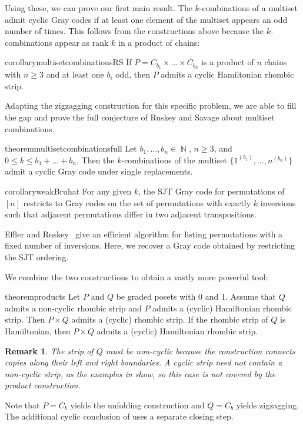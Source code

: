 \documentclass[fontsize=11pt,a4paper,DIV=12]{scrartcl}
\newtheorem{remark}[theorem]{Remark}
\DeclareMathOperator{\N}{\mathbb{N}}
\begin{document}
Using these, we can prove our first main result. The $k$-combinations of a multiset admit cyclic Gray codes if at least one element of the multiset appears an odd number of times. This follows from the constructions above because the $k$-combinations appear as rank $k$ in a product of chains:

\begin{restatable}{corollary}{multisetcombinationsRS}\label{thm:multiset combinations}
	If $P=C_{b_1}\times\ldots\times C_{b_n}$ is a product of $n$ chains with $n\ge 3$ and at least one $b_i$ odd, then $P$ admits a cyclic Hamiltonian
	rhombic strip.
\end{restatable}

Adapting the zigzagging construction for this specific problem, we are able to fill the gap and prove the full conjecture of Ruskey and Savage about multiset combinations.
\begin{restatable}{theorem}{multisetcombinationsfull}\label{thm:multisetcombinationsfull}
	Let $b_1,\ldots,b_n\in\N$, $n\ge 3$, and $0\le k\le b_1+\ldots+b_n$. Then the $k$-combinations of the multiset $\{1^{(b_1)},\ldots,n^{(b_n)}\}$ admit a cyclic Gray code under single replacements.
\end{restatable}

\begin{restatable}{corollary}{weakBruhat}\label{thm:bruhat}
	For any given $k$, the SJT Gray code for permutations of $[n]$ restricts to Gray codes on the set of permutations with exactly $k$ inversions such that adjacent permutations differ in two adjacent transpositions.
\end{restatable}

Effler and Ruskey~\cite{fixedinversions} give an efficient algorithm for listing permutations with a fixed number of inversions. Here, we recover a Gray code obtained by restricting the SJT ordering.

	We combine the two constructions to obtain a vastly more powerful tool:

\begin{restatable}{theorem}{products}\label{thm:products}
	Let $P$ and $Q$ be graded posets with 0 and 1. Assume that $Q$ admits a non-cyclic rhombic strip and $P$ admits a (cyclic) Hamiltonian rhombic strip. Then $P\times Q$ admits a (cyclic) rhombic strip. If the rhombic strip of $Q$ is Hamiltonian, then $P\times Q$ admits a (cyclic) Hamiltonian rhombic strip.
\end{restatable}
\begin{remark}\label{rem:product-boundaries}
	The strip of $Q$ must be non-cyclic because the construction connects copies along their left and right boundaries. A cyclic strip need not contain a non-cyclic strip, as the examples in  show, so this case is not covered by the product construction.
\end{remark}
Note that $P=C_b$ yields the unfolding construction and $Q=C_b$ yields zigzagging. The additional cyclic conclusion of  uses a separate closing step.
\end{document}
